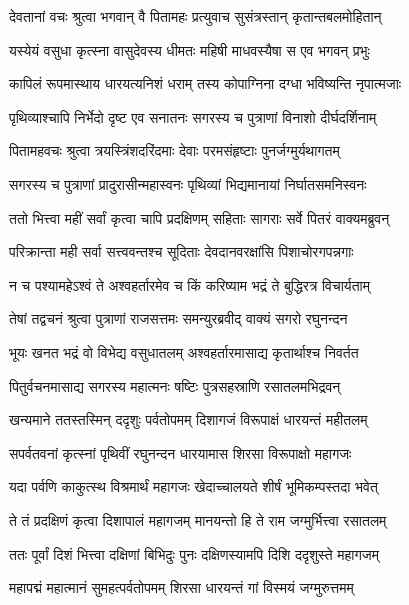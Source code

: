 
\twolineshloka
{देवतानां वचः श्रुत्वा भगवान् वै पितामहः}
{प्रत्युवाच सुसंत्रस्तान् कृतान्तबलमोहितान्} %

\twolineshloka
{यस्येयं वसुधा कृत्स्ना वासुदेवस्य धीमतः}
{महिषी माधवस्यैषा स एव भगवन् प्रभुः} %

\twolineshloka
{कापिलं रूपमास्थाय धारयत्यनिशं धराम्}
{तस्य कोपाग्निना दग्धा भविष्यन्ति नृपात्मजाः} %

\twolineshloka
{पृथिव्याश्चापि निर्भेदो दृष्ट एव सनातनः}
{सगरस्य च पुत्राणां विनाशो दीर्घदर्शिनाम्} %

\twolineshloka
{पितामहवचः श्रुत्वा त्रयस्त्रिंशदरिंदमाः}
{देवाः परमसंहृष्टाः पुनर्जग्मुर्यथागतम्} %

\twolineshloka
{सगरस्य च पुत्राणां प्रादुरासीन्महास्वनः}
{पृथिव्यां भिद्यमानायां निर्घातसमनिस्वनः} %

\twolineshloka
{ततो भित्त्वा महीं सर्वां कृत्वा चापि प्रदक्षिणम्}
{सहिताः सागराः सर्वे पितरं वाक्यमब्रुवन्} %

\twolineshloka
{परिक्रान्ता मही सर्वा सत्त्ववन्तश्च सूदिताः}
{देवदानवरक्षांसि पिशाचोरगपन्नगाः} %

\twolineshloka
{न च पश्यामहेऽश्वं ते अश्वहर्तारमेव च}
{किं करिष्याम भद्रं ते बुद्धिरत्र विचार्यताम्} %

\twolineshloka
{तेषां तद्वचनं श्रुत्वा पुत्राणां राजसत्तमः}
{समन्युरब्रवीद् वाक्यं सगरो रघुनन्दन} %

\twolineshloka
{भूयः खनत भद्रं वो विभेद्य वसुधातलम्}
{अश्वहर्तारमासाद्य कृतार्थाश्च निवर्तत} %

\twolineshloka
{पितुर्वचनमासाद्य सगरस्य महात्मनः}
{षष्टिः पुत्रसहस्राणि रसातलमभिद्रवन्} %

\twolineshloka
{खन्यमाने ततस्तस्मिन् ददृशुः पर्वतोपमम्}
{दिशागजं विरूपाक्षं धारयन्तं महीतलम्} %

\twolineshloka
{सपर्वतवनां कृत्स्नां पृथिवीं रघुनन्दन}
{धारयामास शिरसा विरूपाक्षो महागजः} %

\twolineshloka
{यदा पर्वणि काकुत्स्थ विश्रमार्थं महागजः}
{खेदाच्चालयते शीर्षं भूमिकम्पस्तदा भवेत्} %

\twolineshloka
{ते तं प्रदक्षिणं कृत्वा दिशापालं महागजम्}
{मानयन्तो हि ते राम जग्मुर्भित्त्वा रसातलम्} %

\twolineshloka
{ततः पूर्वां दिशं भित्त्वा दक्षिणां बिभिदुः पुनः}
{दक्षिणस्यामपि दिशि ददृशुस्ते महागजम्} %

\twolineshloka
{महापद्मं महात्मानं सुमहत्पर्वतोपमम्}
{शिरसा धारयन्तं गां विस्मयं जग्मुरुत्तमम्} %

